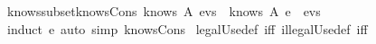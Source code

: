 \begin{isabellebody}
  \endisatagML
  {\isafoldML}%
  \isadelimML
  \isanewline
  \endisadelimML
  \isanewline
  \isamarkupfalse%
  \ knows{\isacharunderscore}subset{\isacharunderscore}knows{\isacharunderscore}Cons{\isacharcolon}\ {\isachardoublequoteopen}knows\ A\ evs\ {\isasymsubseteq}\ knows\ A\ {\isacharparenleft}e\ {\isacharhash}\ evs{\isacharparenright}{\isachardoublequoteclose}\isanewline
  \isadelimproof
  \endisadelimproof
  \isatagproof
  \isamarkupfalse%
  \ {\isacharparenleft}induct\ e{\isacharparenright}\ {\isacharparenleft}auto\ simp{\isacharcolon}\ knows{\isacharunderscore}Cons{\isacharparenright}%
  \endisatagproof
  {\isafoldproof}%
  \isadelimproof
  \isanewline
  \endisadelimproof
  \isanewline
  \isanewline
  \isamarkupfalse%
  \ legalUse{\isacharunderscore}def\ {\isacharbrackleft}iff{\isacharbrackright}\ illegalUse{\isacharunderscore}def\ {\isacharbrackleft}iff{\isacharbrackright}\isanewline
  \isadelimtheory
  \isanewline
  \endisadelimtheory
  \isatagtheory
  \isamarkupfalse%
  \endisatagtheory
  {\isafoldtheory}%
  \isadelimtheory
  \endisadelimtheory
  \end{isabellebody}%
  \endinput
